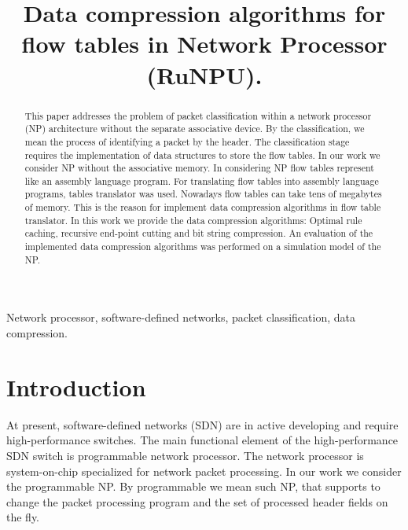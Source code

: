 \documentclass[conference]{IEEEtran}
\begin{document}
\author{
    \and
    }
\title{
    Data compression algorithms for flow tables in Network Processor (RuNPU).
}
\maketitle
    \begin{abstract}
        This paper addresses the problem of packet classification within a network processor (NP) architecture 
        without the separate associative device.
        By the classification, we mean the process of identifying a packet by the header.
        The classification stage requires the implementation of data structures to store the flow tables.
        In our work we consider NP without the associative memory. In considering NP flow tables
        represent like an assembly language program. For translating flow tables into assembly language programs,
        tables translator was used. 
        Nowadays flow tables can take tens of megabytes of memory.
        This is the reason for implement data compression algorithms in flow table translator.
        In this work we provide the data compression algorithms: Optimal rule caching, recursive end-point cutting and
        bit string compression. An evaluation of the implemented data compression algorithms was performed on a 
        simulation model of the NP.
    \end{abstract}
    
    \begin{IEEEkeywords}
        Network processor, software-defined networks, packet classification, data compression.
    \end{IEEEkeywords}

    \section{Introduction}
        At present, software-defined networks (SDN) are in active developing and require high-performance switches.
        The main functional element of the high-performance SDN switch is programmable network processor.
        The network processor is system-on-chip specialized for network packet processing. In our work we consider
        the programmable NP. By programmable we mean such NP, that supports to change the packet processing program 
        and the set of processed header fields on the fly. 
        
\end{document}
